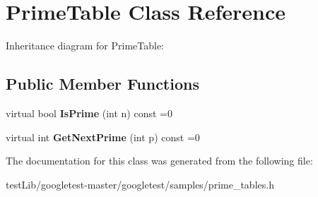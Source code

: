\hypertarget{classPrimeTable}{}\section{Prime\+Table Class Reference}
\label{classPrimeTable}


Inheritance diagram for Prime\+Table\+:
\subsection*{Public Member Functions}
\begin{DoxyCompactItemize}
\item 
\mbox{\label{classPrimeTable_a2ab9243364ded0c51541f641b2df362a}} 
virtual bool {\bfseries Is\+Prime} (int n) const =0
\item 
\mbox{\label{classPrimeTable_ae537c939f56617d8937d57bbbae3ab30}} 
virtual int {\bfseries Get\+Next\+Prime} (int p) const =0
\end{DoxyCompactItemize}


The documentation for this class was generated from the following file\+:\begin{DoxyCompactItemize}
\item 
test\+Lib/googletest-\/master/googletest/samples/prime\+\_\+tables.\+h\end{DoxyCompactItemize}
